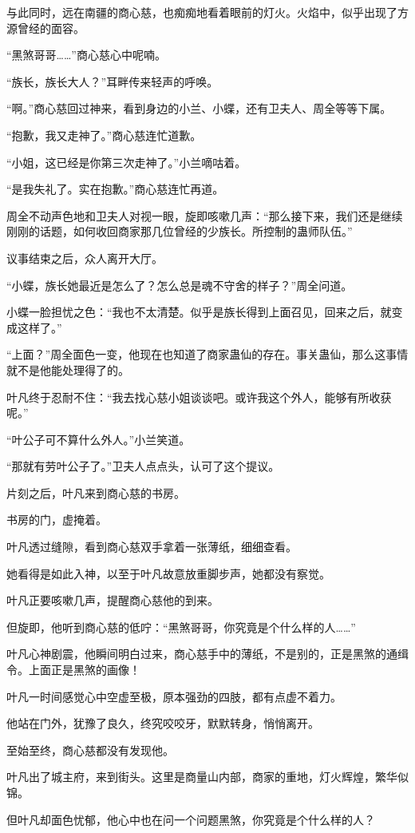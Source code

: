 \begin{this_body}
与此同时，远在南疆的商心慈，也痴痴地看着眼前的灯火。火焰中，似乎出现了方源曾经的面容。

“黑煞哥哥……”商心慈心中呢喃。

“族长，族长大人？”耳畔传来轻声的呼唤。

“啊。”商心慈回过神来，看到身边的小兰、小蝶，还有卫夫人、周全等等下属。

“抱歉，我又走神了。”商心慈连忙道歉。

“小姐，这已经是你第三次走神了。”小兰嘀咕着。

“是我失礼了。实在抱歉。”商心慈连忙再道。

周全不动声色地和卫夫人对视一眼，旋即咳嗽几声：“那么接下来，我们还是继续刚刚的话题，如何收回商家那几位曾经的少族长。所控制的蛊师队伍。”

议事结束之后，众人离开大厅。

“小蝶，族长她最近是怎么了？怎么总是魂不守舍的样子？”周全问道。

小蝶一脸担忧之色：“我也不太清楚。似乎是族长得到上面召见，回来之后，就变成这样了。”

“上面？”周全面色一变，他现在也知道了商家蛊仙的存在。事关蛊仙，那么这事情就不是他能处理得了的。

叶凡终于忍耐不住：“我去找心慈小姐谈谈吧。或许我这个外人，能够有所收获呢。”

“叶公子可不算什么外人。”小兰笑道。

“那就有劳叶公子了。”卫夫人点点头，认可了这个提议。

片刻之后，叶凡来到商心慈的书房。

书房的门，虚掩着。

叶凡透过缝隙，看到商心慈双手拿着一张薄纸，细细查看。

她看得是如此入神，以至于叶凡故意放重脚步声，她都没有察觉。

叶凡正要咳嗽几声，提醒商心慈他的到来。

但旋即，他听到商心慈的低咛：“黑煞哥哥，你究竟是个什么样的人……”

叶凡心神剧震，他瞬间明白过来，商心慈手中的薄纸，不是别的，正是黑煞的通缉令。上面正是黑煞的画像！

叶凡一时间感觉心中空虚至极，原本强劲的四肢，都有点虚不着力。

他站在门外，犹豫了良久，终究咬咬牙，默默转身，悄悄离开。

至始至终，商心慈都没有发现他。

叶凡出了城主府，来到街头。这里是商量山内部，商家的重地，灯火辉煌，繁华似锦。

但叶凡却面色忧郁，他心中也在问一个问题黑煞，你究竟是个什么样的人？


\end{this_body}
